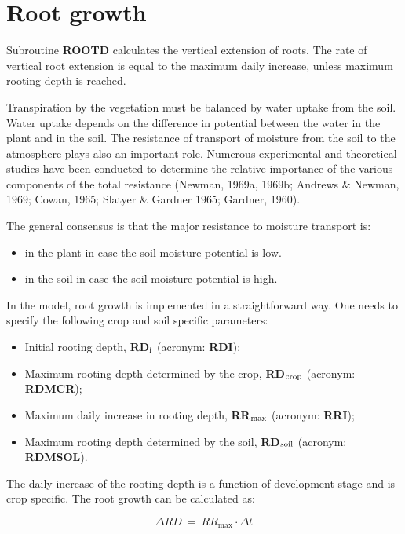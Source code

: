 \section{Root growth}

Subroutine {\bf ROOTD} calculates the vertical extension of roots. The rate of vertical root
extension is equal to the maximum daily increase, unless maximum rooting depth is
reached.

Transpiration by the vegetation must be balanced by water uptake from the soil. Water
uptake depends on the difference in potential between the water in the plant and in the
soil. The resistance of transport of moisture from the soil to the atmo\-sphere plays also an
important role. Numerous experimental and theoretical studies have been conducted to
determine the relative importance of the various components of the total resistance
(Newman, 1969a, 1969b; Andrews \& Newman, 1969; Cowan, 1965; Slatyer \& Gardner
1965; Gardner, 1960).

The general consensus is that the major resistance to moisture transport is:
\begin{itemize}
\item in the plant in case the soil moisture potential is low.
\item in the soil in case the soil moisture potential is high.
\end{itemize}

In the model, root growth is implemented in a straightforward way. One needs to specify
the following crop and soil specific parameters:
\begin{itemize}
\item Initial rooting depth, {\bf RD$_{{\rm i}}$} (acronym: {\bf RDI});
\item Maximum rooting depth determined by the crop, {\bf RD$_{{\rm crop}}$} (acronym: {\bf RDMCR});
\item Maximum daily increase in rooting depth, {\bf RR$_{{\rm max}}$} (acronym: {\bf RRI});
\item Maximum rooting depth determined by the soil, {\bf RD$_{{\rm soil}}$} (acronym: {\bf RDMSOL}).
\end{itemize}

The daily increase of the rooting depth is a function of development stage and is crop
specific. The root growth can be calculated as:

\begin{equation}
\Delta RD~=~RR_{\max} \cdot \Delta t
\end{equation}

